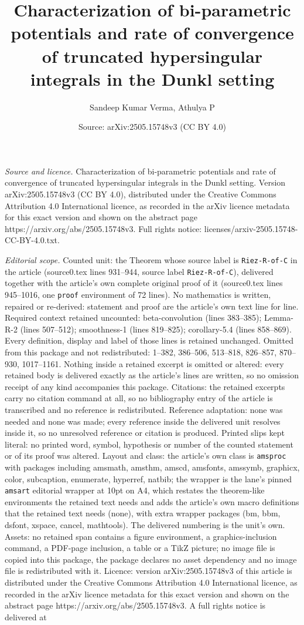 \documentclass[10pt,a4paper]{amsart}
\title[Characterization of bi-parametric potentials and rate of con]{Characterization of bi-parametric potentials and rate of convergence of truncated hypersingular integrals in the Dunkl setting}
\author{Sandeep Kumar Verma, Athulya P}
\date{Source: arXiv:2505.15748v3 (CC BY 4.0)}
\begin{document}
\maketitle

\noindent\emph{Source and licence.} Characterization of bi-parametric potentials and rate of convergence of truncated hypersingular integrals in the Dunkl setting. Version arXiv:2505.15748v3 (CC BY 4.0), distributed under the Creative Commons Attribution 4.0 International licence, as recorded in the arXiv licence metadata for this exact version and shown on the abstract page https://arxiv.org/abs/2505.15748v3. Full rights notice: licenses/arxiv-2505.15748-CC-BY-4.0.txt.\par\smallskip

\noindent\textit{Editorial scope.} Counted unit: the Theorem whose source label is \texttt{Riez-R-of-C} in the article (source0.tex lines 931--944, source label \texttt{Riez-R-of-C}), delivered together with the article's own complete original proof of it (source0.tex lines 945--1016, one \texttt{proof} environment of 72 lines). No mathematics is written, repaired or re-derived: statement and proof are the article's own text line for line. Required context retained uncounted: beta-convolution (lines 383--385); Lemma-R-2 (lines 507--512); smoothness-1 (lines 819--825); corollary-5.4 (lines 858--869). Every definition, display and label of those lines is retained unchanged. Omitted from this package and not redistributed: 1--382, 386--506, 513--818, 826--857, 870--930, 1017--1161. Nothing inside a retained excerpt is omitted or altered: every retained body is delivered exactly as the article's lines are written, so no omission receipt of any kind accompanies this package. Citations: the retained excerpts carry no citation command at all, so no bibliography entry of the article is transcribed and no reference is redistributed. Reference adaptation: none was needed and none was made; every reference inside the delivered unit resolves inside it, so no unresolved reference or citation is produced. Printed slips kept literal: no printed word, symbol, hypothesis or number of the counted statement or of its proof was altered. Layout and class: the article's own class is \texttt{amsproc} with packages including amsmath, amsthm, amscd, amsfonts, amssymb, graphicx, color, subcaption, enumerate, hyperref, natbib; the wrapper is the lane's pinned \texttt{amsart} editorial wrapper at 10pt on A4, which restates the theorem-like environments the retained text needs and adds the article's own macro definitions that the retained text needs (none), with extra wrapper packages (bm, bbm, dsfont, xspace, cancel, mathtools). The delivered numbering is the unit's own. Assets: no retained span contains a figure environment, a graphics-inclusion command, a PDF-page inclusion, a table or a TikZ picture; no image file is copied into this package, the package declares no asset dependency and no image file is redistributed with it. Licence: version arXiv:2505.15748v3 of this article is distributed under the Creative Commons Attribution 4.0 International licence, as recorded in the arXiv licence metadata for this exact version and shown on the abstract page https://arxiv.org/abs/2505.15748v3. A full rights notice is delivered at 
\end{document}

